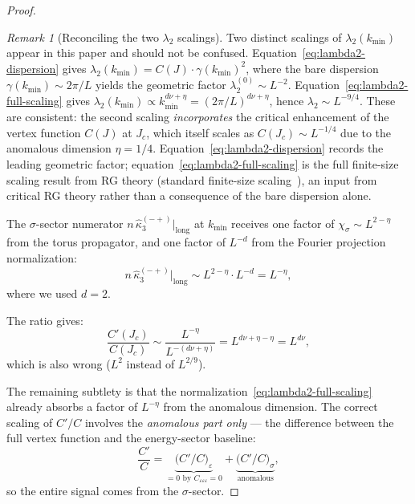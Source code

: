 \documentclass[11pt]{article}
\theoremstyle{definition}
\theoremstyle{remark}
\newtheorem{remark}[theorem]{Remark}
\newcommand{\Jc}{J_c}
\begin{document}
\begin{proof}
\begin{remark}[Reconciling the two $\lambda_2$ scalings]
\label{rem:lambda2-reconciliation}
Two distinct scalings of $\lambda_2(k_{\min})$ appear in this paper
and should not be confused.
Equation~\eqref{eq:lambda2-dispersion} gives $\lambda_2(k_{\min})
= C(J)\cdot\gamma(k_{\min})^2$, where the bare dispersion
$\gamma(k_{\min}) \sim 2\pi/L$ yields the geometric factor
$\lambda_2^{(0)} \sim L^{-2}$.
Equation~\eqref{eq:lambda2-full-scaling} gives $\lambda_2(k_{\min})
\propto k_{\min}^{d\nu+\eta} = (2\pi/L)^{d\nu+\eta}$, hence
$\lambda_2 \sim L^{-9/4}$.
These are consistent: the second scaling \emph{incorporates}
the critical enhancement of the vertex function $C(J)$ at $\Jc$,
which itself scales as $C(\Jc) \sim L^{-1/4}$ due to the anomalous
dimension $\eta = 1/4$.
Equation~\eqref{eq:lambda2-dispersion} records the leading geometric
factor; equation~\eqref{eq:lambda2-full-scaling} is the full
finite-size scaling result from RG theory (standard finite-size
scaling~\cite{Privman1990,CardyBook1996}), an input from critical
RG theory rather than a consequence of the bare dispersion alone.
\end{remark}

The $\sigma$-sector numerator
$n\,\hat{\kappa}_3^{(-+)}|_{\mathrm{long}}$ at
$k_{\min}$ receives one factor of $\chi_\sigma \sim
L^{2-\eta}$ from the torus propagator, and one factor of
$L^{-d}$ from the Fourier projection normalization:
\begin{equation}
  n\,\hat{\kappa}_3^{(-+)}\big|_{\mathrm{long}}
    \sim L^{2-\eta} \cdot L^{-d} = L^{-\eta},
  \label{eq:numerator-scaling}
\end{equation}
where we used $d = 2$.

The ratio gives:
\begin{equation}
  \frac{C'(\Jc)}{C(\Jc)} \sim
    \frac{L^{-\eta}}{L^{-(d\nu + \eta)}}
    = L^{d\nu + \eta - \eta}
    = L^{d\nu},
  \label{eq:ratio-wrong-again}
\end{equation}
which is also wrong ($L^2$ instead of $L^{2/9}$).

The remaining subtlety is that the
normalization~\eqref{eq:lambda2-full-scaling} already absorbs
a factor of $L^{-\eta}$ from the anomalous dimension.
The correct scaling of $C'/C$ involves the \emph{anomalous
part only} --- the difference between the full vertex function
and the energy-sector baseline:
\begin{equation}
  \frac{C'}{C} = \underbrace{\bigl(C'/C\bigr)_\varepsilon}
    _{\text{$= 0$ by } C_{\varepsilon\varepsilon\varepsilon}=0}
    + \underbrace{\bigl(C'/C\bigr)_\sigma}
    _{\text{anomalous}},
  \label{eq:CpC-anomalous}
\end{equation}
so the entire signal comes from the $\sigma$-sector.


\end{proof}
\end{document}
